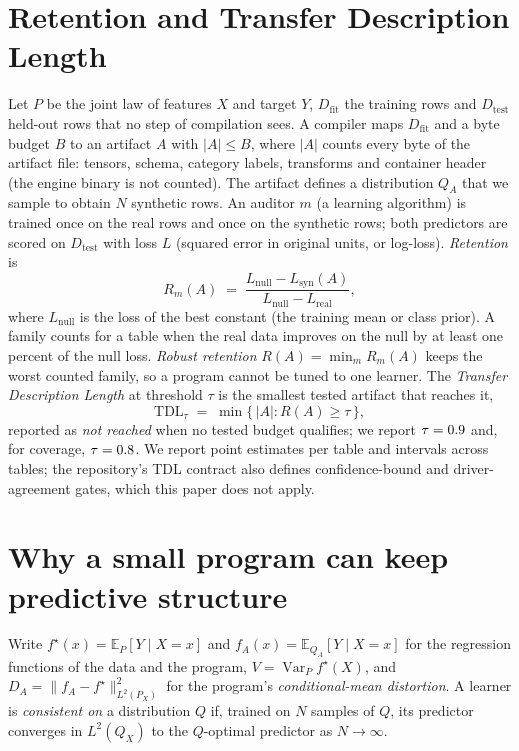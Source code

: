 \section{Retention and Transfer Description Length}
\label{sec:metric}

Let $P$ be the joint law of features $X$ and target $Y$, $D_{\mathrm{fit}}$ the training rows and
$D_{\mathrm{test}}$ held-out rows that no step of compilation sees. A compiler maps $D_{\mathrm{fit}}$ and a
byte budget $B$ to an artifact $A$ with $|A|\le B$, where $|A|$ counts every byte of the artifact
file: tensors, schema, category labels, transforms and container header (the engine binary is not
counted). The artifact defines a
distribution $Q_A$ that we sample to obtain $N$ synthetic rows. An auditor $m$ (a learning
algorithm) is trained once on the real rows and once on the synthetic rows; both predictors are
scored on $D_{\mathrm{test}}$ with loss $L$ (squared error in original units, or log-loss).
\emph{Retention} is
\begin{equation}
  R_m(A) \;=\; \frac{L_{\mathrm{null}} - L_{\mathrm{syn}}(A)}{L_{\mathrm{null}} - L_{\mathrm{real}}},
  \label{eq:retention}
\end{equation}
where $L_{\mathrm{null}}$ is the loss of the best constant (the training mean or class prior). A
family counts for a table when the real data improves on the null by at least one percent of the
null loss. \emph{Robust retention} $R(A)=\min_m R_m(A)$ keeps the worst counted family, so a program
cannot be tuned to one learner. The \emph{Transfer Description Length} at threshold $\tau$ is the
smallest tested artifact that reaches it,
\begin{equation}
  \mathrm{TDL}_\tau \;=\; \min\{\,|A| : R(A) \ge \tau\,\},
  \label{eq:tdl}
\end{equation}
reported as \emph{not reached} when no tested budget qualifies; we report $\tau=0.9$
and, for coverage, $\tau=0.8$. We report point estimates per table and
intervals across tables; the repository's TDL contract also defines confidence-bound and
driver-agreement gates, which this paper does not apply.

\section{Why a small program can keep predictive structure}
\label{sec:theory}

Write $f^\star(x)=\mathbb{E}_P[Y\mid X=x]$ and $f_A(x)=\mathbb{E}_{Q_A}[Y\mid X=x]$ for the regression
functions of the data and the program, $V=\operatorname{Var}_P f^\star(X)$, and
$D_A=\lVert f_A-f^\star\rVert^2_{L^2(P_X)}$ for the program's \emph{conditional-mean distortion}. A
learner is \emph{consistent on} a distribution $Q$ if, trained on $N$ samples of $Q$, its predictor
converges in $L^2(Q_X)$ to the $Q$-optimal predictor as $N\to\infty$.

